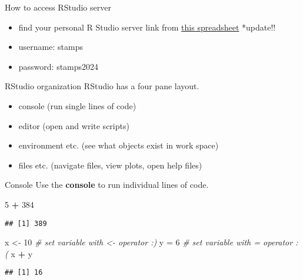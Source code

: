 \documentclass[
  ignorenonframetext,
]{beamer}
\newenvironment{Shaded}{\begin{snugshade}}{\end{snugshade}}
\newcommand{\CommentTok}[1]{\textcolor[rgb]{0.56,0.35,0.01}{\textit{#1}}}
\newcommand{\DecValTok}[1]{\textcolor[rgb]{0.00,0.00,0.81}{#1}}
\newcommand{\NormalTok}[1]{#1}
\newcommand{\OtherTok}[1]{\textcolor[rgb]{0.56,0.35,0.01}{#1}}
\newcommand{\SpecialCharTok}[1]{\textcolor[rgb]{0.81,0.36,0.00}{\textbf{#1}}}
\providecommand{\tightlist}{%
  \setlength{\itemsep}{0pt}\setlength{\parskip}{0pt}}
\begin{document}
\begin{frame}{How to access RStudio server}
\label{how-to-access-rstudio-server}
\begin{itemize}
\tightlist
\item
  find your personal R Studio server link from
  \href{https://hackmd.io/oz5sTY9KRCqdHHkM9iNJyg?view}{this spreadsheet}
  *update!!
\item
  username: stamps
\item
  password: stamps2024
\end{itemize}
\end{frame}

\begin{frame}{RStudio organization}
\label{rstudio-organization}
RStudio has a four pane layout.

\begin{itemize}
\tightlist
\item
  console (run single lines of code)
\item
  editor (open and write scripts)
\item
  environment etc. (see what objects exist in work space)
\item
  files etc. (navigate files, view plots, open help files)
\end{itemize}
\end{frame}

\begin{frame}[fragile]{Console}
\label{console}
Use the \textbf{console} to run individual lines of code.

\begin{Shaded}
\begin{Highlighting}[]
\DecValTok{5} \SpecialCharTok{+} \DecValTok{384}
\end{Highlighting}
\end{Shaded}

\begin{verbatim}
## [1] 389
\end{verbatim}

\begin{Shaded}
\begin{Highlighting}[]
\NormalTok{x }\OtherTok{\textless{}{-}} \DecValTok{10} \CommentTok{\# set variable with \textless{}{-} operator :) }
\NormalTok{y }\OtherTok{=} \DecValTok{6} \CommentTok{\# set variable with = operator :( }
\NormalTok{x }\SpecialCharTok{+}\NormalTok{ y}
\end{Highlighting}
\end{Shaded}

\begin{verbatim}
## [1] 16
\end{verbatim}
\end{frame}
\end{document}
